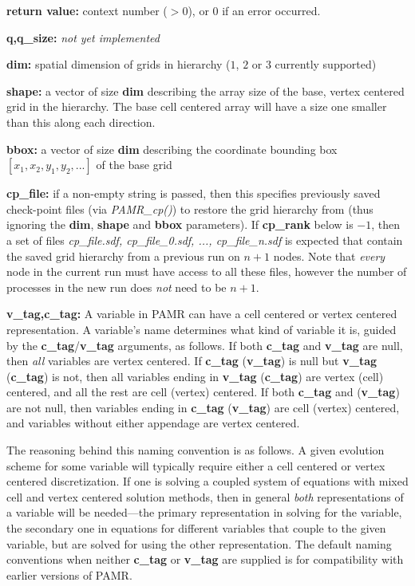\documentclass[aps,amssymb,unsortedaddress,nofootinbib]{revtex4}
\def\lsep{\itemsep 0.05in}
\begin{document}
\begin{list}{}{\lsep}
\item {\bf return value:} context number ($>0$), or $0$ if an error occurred. 
\item {\bf q,q\_size:} {\em not yet implemented} 
\item {\bf dim:} spatial dimension of grids in hierarchy ($1$, $2$ or $3$ currently supported) 
\item {\bf *shape:} a vector of size {\bf dim} describing the array size of the base,
                    vertex centered grid in the hierarchy. The base cell centered array
                    will have a size one smaller than this along each direction.
\item {\bf *bbox:} a vector of size {\bf dim} describing the coordinate bounding box $[x_1,x_2,y_1,y_2,...]$ of the base grid
\item {\bf cp\_file:} if a non-empty string is passed, then this
specifies previously saved check-point files (via {\em PAMR\_cp()})
to restore the
grid hierarchy from (thus ignoring the {\bf dim}, {\bf shape} and
{\bf bbox} parameters). If {\bf cp\_rank} below is $-1$, then
a set of files {\em cp\_file.sdf, cp\_file\_0.sdf, ..., cp\_file\_n.sdf} 
is expected that contain
the saved grid hierarchy from a previous run on $n+1$ nodes. Note
that {\em every} node in the current run must have access to all
these files, however the number of processes in the new run does {\em not}
need to be $n+1$.
\item {\bf v\_tag,c\_tag:} 
      A variable in PAMR can have a cell centered or vertex centered
      representation. A variable's name determines what kind of variable it
      is, guided by the {\bf c\_tag}/{\bf v\_tag} arguments, as follows.
      If both {\bf c\_tag} and {\bf v\_tag} are null, then {\em all} variables are 
      vertex centered. 
      If {\bf c\_tag} ({\bf v\_tag}) is null but {\bf v\_tag} ({\bf c\_tag}) is not, 
      then all variables ending in {\bf v\_tag} ({\bf c\_tag}) are vertex (cell)
      centered, and all the rest are cell (vertex) centered.
      If both {\bf c\_tag} and ({\bf v\_tag}) are not null, then variables ending in {\bf c\_tag}
      ({\bf v\_tag}) are cell (vertex) centered, and variables without either
      appendage are vertex centered.

      The reasoning behind this naming convention is as follows. A given evolution scheme
      for some variable will typically require either a cell centered or vertex centered
      discretization. If one is solving a coupled system of equations with mixed cell
      and vertex centered solution methods, then in general {\em both} representations
      of a variable will be needed---the primary representation in solving for the variable,
      the secondary one in equations for different variables that couple to the given variable, but
      are solved for using the other representation. The default naming conventions
      when neither {\bf c\_tag} or {\bf v\_tag} are supplied is for compatibility 
      with earlier versions of PAMR.
      

\end{list}
\end{document}
